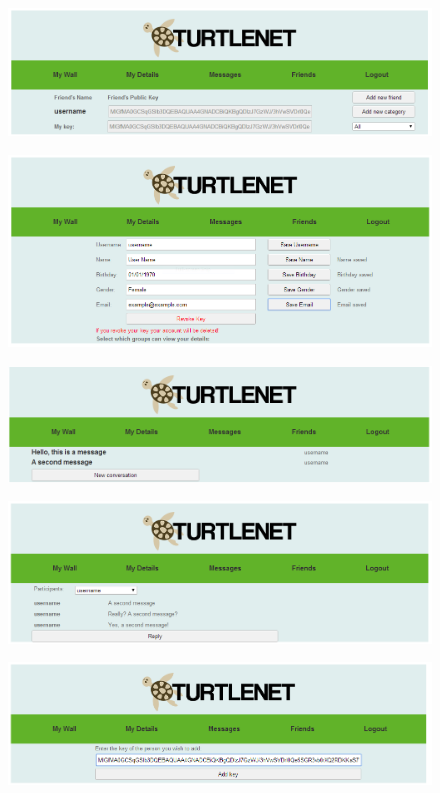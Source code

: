 \begin{figure}[h]
    \centering
    \includegraphics{images/screenshots/crop9.png}
\end{figure}

\begin{figure}[h]
    \centering
    \includegraphics{images/screenshots/crop10.png}
\end{figure}

\begin{figure}[h]
    \centering
    \includegraphics{images/screenshots/crop11.png}
\end{figure}

\begin{figure}[h]
    \centering
    \includegraphics{images/screenshots/crop12.png}
\end{figure}

\begin{figure}[h]
    \centering
    \includegraphics{images/screenshots/crop13.png}
\end{figure}